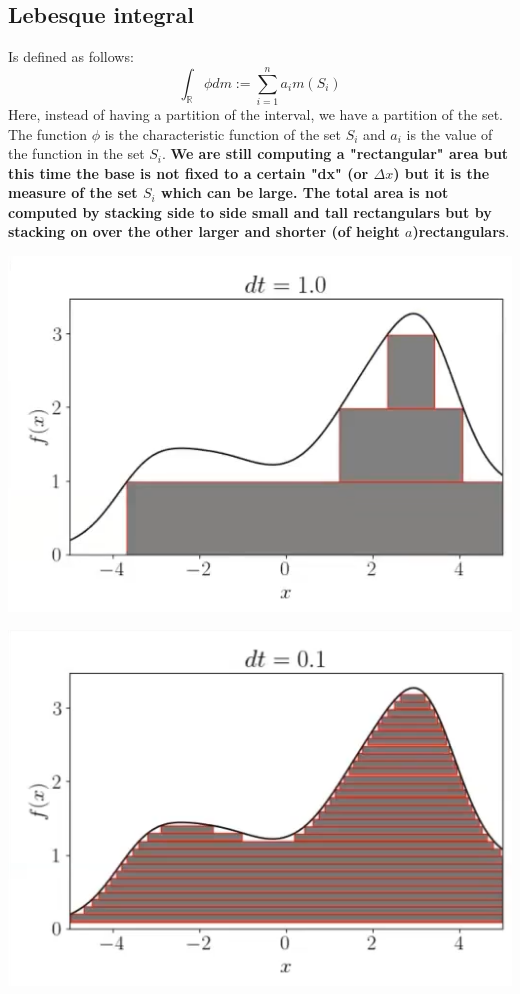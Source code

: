 \subsection{Lebesque integral}
Is defined as follows: 
\[
    \int_{\mathbb{R}}\phi dm := \sum_{i=1}^{n} a_i m(S_i)    
\]
Here, instead of having a partition of the interval, we have a partition of the set. The function $\phi$ is the characteristic function of the set $S_i$ and $a_i$ is the value of the function in the set $S_i$. \textbf{We are still computing a "rectangular" area but this time the base is not fixed to a certain "dx" (or $\Delta x$) but it is the measure of the set $S_i$ which can be large. The total area is not computed by stacking side to side small and tall rectangulars but by stacking on over the other larger and shorter (of height $a$)rectangulars}.\\
\begin{multicols}{2}
    \begin{center}
        \includegraphics[scale = 0.4]{../images/LebesgueIntegral.png}
    \end{center}
    \begin{center}
        \includegraphics[scale = 0.4]{../images/LebesgueThinner.png}
    \end{center}
\end{multicols}
